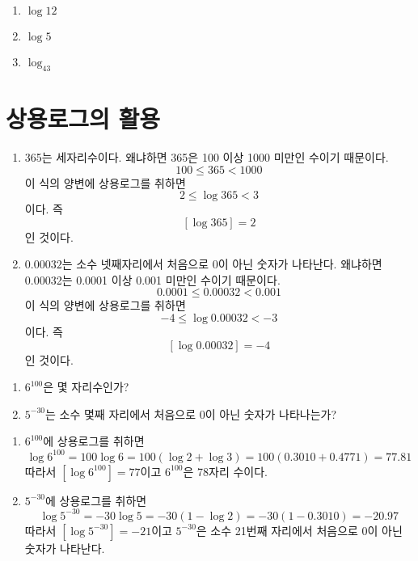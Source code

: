\documentclass{oblivoir}
\begin{document}
%
\begin{enumerate}\label{common7}
\item
\(\log12\)
\item
\(\log5\)
\item
\(\log_43\)
\end{enumerate}

\section{상용로그의 활용}
%
\exam{}
\begin{enumerate}\label{app1}
\item
365는 세자리수이다.
왜냐하면 365은 100 이상 1000 미만인 수이기 때문이다.
\[100\le365<1000\]
이 식의 양변에 상용로그를 취하면
\[2\le\log365<3\]
이다.
즉
\[[\log365]=2\]
인 것이다.
\begin{center}
\end{center}
\item
\(0.00032\)는 소수 넷째자리에서 처음으로 0이 아닌 숫자가 나타난다.
왜냐하면 0.00032는 0.0001 이상 0.001 미만인 수이기 때문이다.
\[0.0001\le0.00032<0.001\]
이 식의 양변에 상용로그를 취하면
\[-4\le\log0.00032<-3\]
이다.
즉
\[[\log0.00032]=-4\]
인 것이다.
\begin{center}
\end{center}
\end{enumerate}

\newpage
%
\begin{enumerate}\label{app2}
\item
\(6^{100}\)은 몇 자리수인가?
\item
\(5^{-30}\)는 소수 몇째 자리에서 처음으로 0이 아닌 숫자가 나타나는가?
\end{enumerate}
\begin{mdframed}
\begin{enumerate}
\item
\(6^{100}\)에 상용로그를 취하면
\[\log6^{100}=100\log6=100(\log2+\log3)=100(0.3010+0.4771)=77.81\]
따라서 \([\log6^{100}]=77\)이고 \(6^{100}\)은 78자리 수이다.
\item
\(5^{-30}\)에 상용로그를 취하면
\[\log5^{-30}=-30\log5=-30(1-\log2)=-30(1-0.3010)=-20.97\]
따라서 \([\log5^{-30}]=-21\)이고 \(5^{-30}\)은 소수 21번째 자리에서 처음으로 0이 아닌 숫자가 나타난다.
\end{enumerate}
\end{mdframed}
\end{document}
